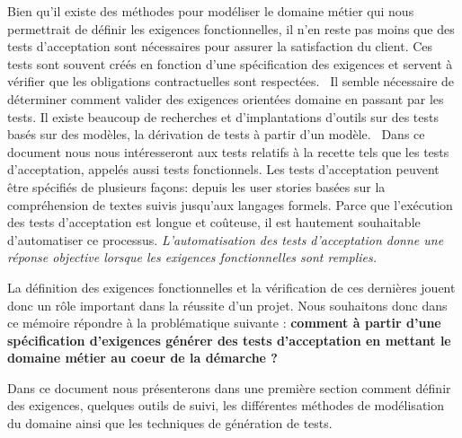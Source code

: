 Bien qu'il existe des méthodes pour modéliser le domaine métier qui nous permettrait de définir les exigences fonctionnelles, il n'en reste pas moins que des tests d'acceptation sont nécessaires pour assurer la satisfaction du client. Ces tests sont souvent créés en fonction d'une spécification des exigences et servent à vérifier que les obligations contractuelles sont respectées.~\cite{article6} Il semble nécessaire de déterminer comment valider des exigences orientées domaine en passant par les tests. 
Il existe beaucoup de recherches et d'implantations d'outils sur des tests basés sur des modèles, la dérivation de tests à partir d'un modèle.~\cite{article7} Dans ce document nous nous intéresseront aux tests relatifs à la recette tels que les tests d'acceptation, appelés aussi tests fonctionnels. Les tests d'acceptation peuvent être spécifiés de plusieurs façons: depuis les user stories basées sur la compréhension de textes suivis jusqu'aux langages formels. Parce que l'exécution des tests d'acceptation est longue et coûteuse, il est hautement souhaitable d'automatiser ce processus. \textit{L'automatisation des tests d'acceptation donne une réponse objective lorsque les exigences fonctionnelles sont remplies.~\cite{article6}}

La définition des exigences fonctionnelles et la vérification de ces dernières jouent donc un rôle important dans la réussite d'un projet. Nous souhaitons donc dans ce mémoire répondre à la problématique suivante : 
  \textbf{comment à partir d'une spécification d'exigences générer des tests d'acceptation en mettant le domaine métier au coeur de la démarche ? }


Dans ce document nous présenterons dans une première section comment définir des exigences, quelques outils de suivi, les différentes méthodes de modélisation du domaine ainsi que les techniques de génération de tests.

